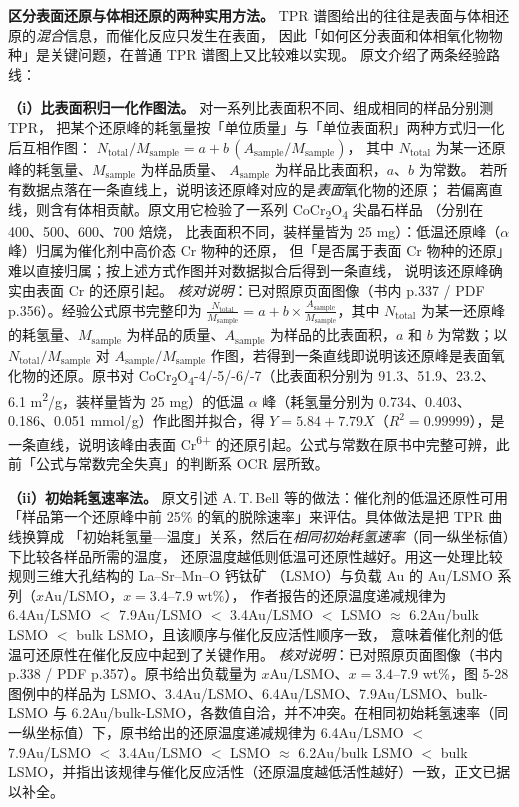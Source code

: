 \begin{dataflow}
\textbf{区分表面还原与体相还原的两种实用方法。}
TPR 谱图给出的往往是表面与体相还原的\emph{混合}信息，而催化反应只发生在表面，
因此「如何区分表面和体相氧化物物种」是关键问题，在普通 TPR 谱图上又比较难以实现。
原文介绍了两条经验路线：

\textbf{（i）比表面积归一化作图法。} 对一系列比表面积不同、组成相同的样品分别测 TPR，
把某个还原峰的耗氢量按「单位质量」与「单位表面积」两种方式归一化后互相作图：
$N_{\mathrm{total}}/M_{\mathrm{sample}}=a+b\,(A_{\mathrm{sample}}/M_{\mathrm{sample}})$，
其中 $N_{\mathrm{total}}$ 为某一还原峰的耗氢量、$M_{\mathrm{sample}}$ 为样品质量、
$A_{\mathrm{sample}}$ 为样品比表面积，$a$、$b$ 为常数。
若所有数据点落在一条直线上，说明该还原峰对应的是\emph{表面}氧化物的还原；
若偏离直线，则含有体相贡献。原文用它检验了一系列 CoCr\textsubscript{2}O\textsubscript{4} 尖晶石样品
（分别在 \qty{400}{\degC}、\qty{500}{\degC}、\qty{600}{\degC}、\qty{700}{\degC} 焙烧，
比表面积不同，装样量皆为 25 mg）：低温还原峰（$\alpha$ 峰）归属为催化剂中高价态 Cr 物种的还原，
但「是否属于表面 Cr 物种的还原」难以直接归属；按上述方式作图并对数据拟合后得到一条直线，
说明该还原峰确实由表面 Cr 的还原引起。
\emph{核对说明}：已对照原页面图像（书内 p.337 / PDF p.356）。经验公式原书完整印为 $\frac{N_{\mathrm{total}}}{M_{\mathrm{sample}}}=a+b\times\frac{A_{\mathrm{sample}}}{M_{\mathrm{sample}}}$，其中 $N_{\mathrm{total}}$ 为某一还原峰的耗氢量、$M_{\mathrm{sample}}$ 为样品的质量、$A_{\mathrm{sample}}$ 为样品的比表面积，$a$ 和 $b$ 为常数；以 $N_{\mathrm{total}}/M_{\mathrm{sample}}$ 对 $A_{\mathrm{sample}}/M_{\mathrm{sample}}$ 作图，若得到一条直线即说明该还原峰是表面氧化物的还原。原书对 CoCr\textsubscript{2}O\textsubscript{4}-4/-5/-6/-7（比表面积分别为 91.3、51.9、23.2、6.1 m\textsuperscript{2}/g，装样量皆为 25 mg）的低温 $\alpha$ 峰（耗氢量分别为 0.734、0.403、0.186、0.051 mmol/g）作此图并拟合，得 $Y=5.84+7.79X$（$R^2=0.99999$），是一条直线，说明该峰由表面 Cr\textsuperscript{6+} 的还原引起。公式与常数在原书中完整可辨，此前「公式与常数完全失真」的判断系 OCR 层所致。

\textbf{（ii）初始耗氢速率法。} 原文引述 A.\,T.\,Bell 等的做法：催化剂的低温还原性可用
「样品第一个还原峰中前 25\% 的氧的脱除速率」来评估。具体做法是把 TPR 曲线换算成
「初始耗氢量—温度」关系，然后在\emph{相同初始耗氢速率}（同一纵坐标值）下比较各样品所需的温度，
还原温度越低则低温可还原性越好。用这一处理比较规则三维大孔结构的 La--Sr--Mn--O 钙钛矿
（LSMO）与负载 Au 的 Au/LSMO 系列（$x$Au/LSMO，$x=3.4$--$7.9$ wt\%），
作者报告的还原温度递减规律为 6.4Au/LSMO $<$ 7.9Au/LSMO $<$ 3.4Au/LSMO $<$
LSMO $\approx$ 6.2Au/bulk LSMO $<$ bulk LSMO，且该顺序与催化反应活性顺序一致，
意味着催化剂的低温可还原性在催化反应中起到了关键作用。
\emph{核对说明}：已对照原页面图像（书内 p.338 / PDF p.357）。原书给出负载量为 $x$Au/LSMO、$x=3.4$--$7.9$ wt\%，图 5-28 图例中的样品为 LSMO、3.4Au/LSMO、6.4Au/LSMO、7.9Au/LSMO、bulk-LSMO 与 6.2Au/bulk-LSMO，各数值自洽，并不冲突。在相同初始耗氢速率（同一纵坐标值）下，原书给出的还原温度递减规律为 6.4Au/LSMO $<$ 7.9Au/LSMO $<$ 3.4Au/LSMO $<$ LSMO $\approx$ 6.2Au/bulk LSMO $<$ bulk LSMO，并指出该规律与催化反应活性（还原温度越低活性越好）一致，正文已据以补全。


\end{dataflow}
